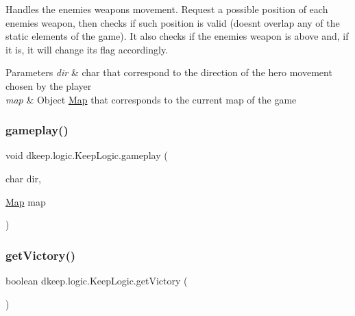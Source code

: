 Handles the enemies\textquotesingle{} weapons movement. Request a possible position of each enemies\textquotesingle{} weapon, then checks if such position is valid (doesn\textquotesingle{}t overlap any of the static elements of the game). It also checks if the enemies\textquotesingle{} weapon is above and, if it is, it will change it\textquotesingle{}s flag accordingly. 
\begin{DoxyParams}{Parameters}
{\em dir} & char that correspond to the direction of the hero movement chosen by the player \\
\hline
{\em map} & Object \hyperlink{classdkeep_1_1logic_1_1_map}{Map} that corresponds to the current map of the game \\
\hline
\end{DoxyParams}
\mbox{\label{classdkeep_1_1logic_1_1_keep_logic_a3fd0f0c657498c6cbe5d853bbf35b421}} 
\subsubsection{\texorpdfstring{gameplay()}{gameplay()}}
{\footnotesize\ttfamily void dkeep.\+logic.\+Keep\+Logic.\+gameplay (\begin{DoxyParamCaption}\item[{char}]{dir,  }\item[{\hyperlink{classdkeep_1_1logic_1_1_map}{Map}}]{map }\end{DoxyParamCaption})}

\mbox{\label{classdkeep_1_1logic_1_1_keep_logic_ac46609fcbfdc60046724ae28b369de4a}} 
\subsubsection{\texorpdfstring{get\+Victory()}{getVictory()}}
{\footnotesize\ttfamily boolean dkeep.\+logic.\+Keep\+Logic.\+get\+Victory (\begin{DoxyParamCaption}{ }\end{DoxyParamCaption})}

